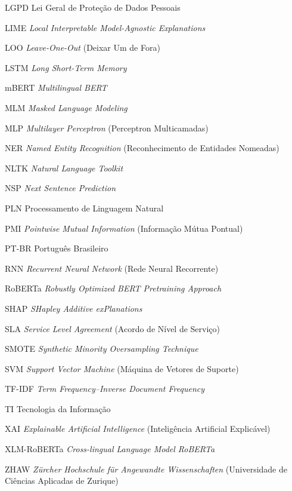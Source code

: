\documentclass[
    12pt,                %
    openright,           %
    oneside,             %
    a4paper,             %
    english,             %
    brazil               %
]{abntex2}
\begin{document}
\begin{siglas}
  \item[LGPD] Lei Geral de Proteção de Dados Pessoais
  \item[LIME] \textit{Local Interpretable Model-Agnostic Explanations}
  \item[LOO] \textit{Leave-One-Out} (Deixar Um de Fora)
  \item[LSTM] \textit{Long Short-Term Memory}
  \item[mBERT] \textit{Multilingual BERT}
  \item[MLM] \textit{Masked Language Modeling}
  \item[MLP] \textit{Multilayer Perceptron} (Perceptron Multicamadas)
  \item[NER] \textit{Named Entity Recognition} (Reconhecimento de Entidades Nomeadas)
  \item[NLTK] \textit{Natural Language Toolkit}
  \item[NSP] \textit{Next Sentence Prediction}
  \item[PLN] Processamento de Linguagem Natural
  \item[PMI] \textit{Pointwise Mutual Information} (Informação Mútua Pontual)
  \item[PT-BR] Português Brasileiro
  \item[RNN] \textit{Recurrent Neural Network} (Rede Neural Recorrente)
  \item[RoBERTa] \textit{Robustly Optimized BERT Pretraining Approach}
  \item[SHAP] \textit{SHapley Additive exPlanations}
  \item[SLA] \textit{Service Level Agreement} (Acordo de Nível de Serviço)
  \item[SMOTE] \textit{Synthetic Minority Oversampling Technique}
  \item[SVM] \textit{Support Vector Machine} (Máquina de Vetores de Suporte)
  \item[TF-IDF] \textit{Term Frequency–Inverse Document Frequency}
  \item[TI] Tecnologia da Informação
  \item[XAI] \textit{Explainable Artificial Intelligence} (Inteligência Artificial Explicável)
  \item[XLM-RoBERTa] \textit{Cross-lingual Language Model RoBERTa}
  \item[ZHAW] \textit{Zürcher Hochschule für Angewandte Wissenschaften} (Universidade de Ciências Aplicadas de Zurique)
\end{siglas}

\tableofcontents*
\cleardoublepage
\end{document}
